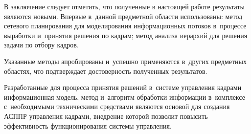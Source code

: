 В заключение следует отметить, что полученные в настоящей работе результаты являются новыми. Впервые в~данной предметной области использованы: метод сетевого планирования для моделирования информационных потоков в~процессе выработки и~принятия решения по кадрам; метод анализа иерархий для решения задачи по отбору кадров.



Указанные методы апробированы и~успешно применяются в~других предметных областях, что подтверждает достоверность полученных результатов.



Разработанные для процесса принятия решений в~системе управления кадрами информационная модель, метод и~алгоритм обработки информации в~комплексе с~необходимыми техническими средствами являются основой для создания АСППР управления кадрами, внедрение которой позволит повысить эффективность функционирования системы управления.



\vspace{-3mm}



